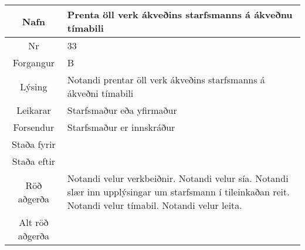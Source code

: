 \documentclass[a4paper]{article}
\begin{document}
\begin{tabular}{|c|p{10cm}|}
\hline
Nafn&Prenta öll verk ákveðins starfsmanns á ákveðnu tímabili\\
\hline
Nr&33\\
\hline
Forgangur&B\\
\hline
Lýsing&Notandi prentar öll verk ákveðins starfsmanns á ákveðni tímabili\\
\hline
Leikarar&Starfsmaður eða yfirmaður\\
\hline
Forsendur&Starfsmaður er innskráður\\
\hline
Staða fyrir&\\
\hline
Staða eftir&\\
\hline
Röð aðgerða&Notandi velur verkbeiðnir. Notandi velur sía. Notandi slær inn upplýsingar um starfsmann í tileinkaðan reit. Notandi velur tímabil. Notandi velur leita.\\
\hline
Alt röð aðgerða&\\
\hline
\end{tabular}
\end{document}
